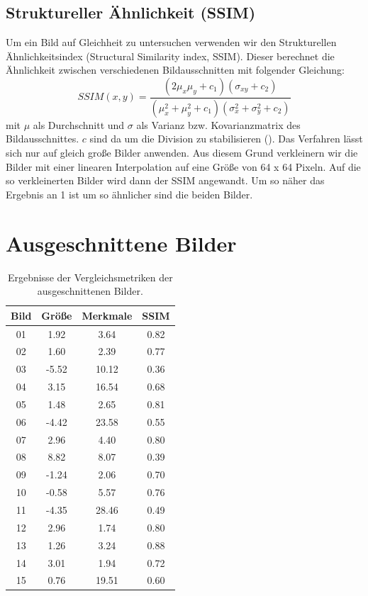 \subsection{Struktureller Ähnlichkeit (SSIM)}
Um ein Bild auf Gleichheit zu untersuchen verwenden wir den Strukturellen Ähnlichkeitsindex (Structural Similarity index, SSIM). Dieser berechnet die Ähnlichkeit zwischen verschiedenen Bildausschnitten mit folgender Gleichung:
$$
SSIM(x,y) = \frac{(2 \mu_x \mu_y + c_1)(\sigma_{xy} + c_2)}{(\mu^2_x + \mu^2_y + c_1)(\sigma^2_x + \sigma^2_y + c_2)}
$$ 
mit $\mu$ als Durchschnitt und $\sigma$ als Varianz bzw. Kovarianzmatrix des Bildausschnittes. $c$ sind da um die Division zu stabilisieren (\cite{Wang2004}). Das Verfahren lässt sich nur auf gleich große Bilder anwenden. Aus diesem Grund verkleinern wir die Bilder mit einer linearen Interpolation auf eine Größe von 64 x 64 Pixeln. Auf die so verkleinerten Bilder wird dann der SSIM angewandt. Um so näher das Ergebnis an 1 ist um so ähnlicher sind die beiden Bilder. 

\section{Ausgeschnittene Bilder}

\begin{table}[h]
	\centering
	\begin{tabular}{c|ccc}
	Bild & Größe & Merkmale & SSIM \\ \hline 
	01 & 1.92 & 3.64 & 0.82 \\
	02 & 1.60 & 2.39 & 0.77 \\
	03 & -5.52 & 10.12 & 0.36 \\
	04 & 3.15 & 16.54 & 0.68 \\ 
	05 & 1.48 & 2.65 & 0.81 \\ \hline
	06 & -4.42 & 23.58 & 0.55 \\ 
	07 & 2.96 & 4.40 & 0.80 \\
	08 & 8.82 & 8.07 & 0.39 \\
	09 & -1.24 & 2.06 & 0.70 \\
	10 & -0.58 & 5.57 & 0.76 \\ \hline
	11 & -4.35 & 28.46 & 0.49 \\
	12 & 2.96 & 1.74 & 0.80 \\
	13 & 1.26 & 3.24 & 0.88 \\
	14 & 3.01 & 1.94 & 0.72 \\
	15 & 0.76 & 19.51 & 0.60 
	\end{tabular}
	\caption{Ergebnisse der Vergleichsmetriken der ausgeschnittenen Bilder.}
	\label{tab:metrics}
\end{table}

